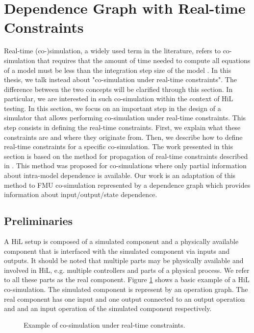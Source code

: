\section{\label{sec:grphrtsc}Dependence Graph with Real-time Constraints}

Real-time (co-)simulation, a widely used term in the literature, refers to co-simulation that requires that the amount of time needed to compute all equations of a model must be less than the integration step size of the model \cite{belanger:2010}. In this thesis, we talk instead about "co-simulation under real-time constraints". The difference between the two concepts will be clarified through this section. In particular, we are interested in such co-simulation within the context of HiL testing. In this section, we focus on an important step in the design of a simulator that allows performing co-simulation under real-time constraints. This step consists in defining the real-time constraints. First, we explain what these constraints are and where they originate from. Then, we describe how to define real-time constraints for a specific co-simulation. The work presented in this section is based on the method for propagation of real-time constraints described in \cite{faure:2011}. This method was proposed for co-simulations where only partial information about intra-model dependence is available. Our work is an adaptation of this method to FMU co-simulation represented by a dependence graph which provides information about input/output/state dependence.

\subsection{Preliminaries}

A HiL setup is composed of a simulated component and a physically available component that is interfaced with the simulated component via inputs and outputs. It should be noted that multiple parts may be physically available and involved in HiL, e.g. multiple controllers and parts of a physical process. We refer to all these parts as the real component. Figure \ref{fig:hilSetup} shows a basic example of a HiL co-simulation. The simulated component is represent by an operation graph. The real component has one input and one output connected to an output operation and and an input operation of the simulated component respectively. 

\begin{figure}[phbt]
\centering

\caption{Example of co-simulation under real-time constraints.}
\label{fig:hilSetup}
\end{figure}


